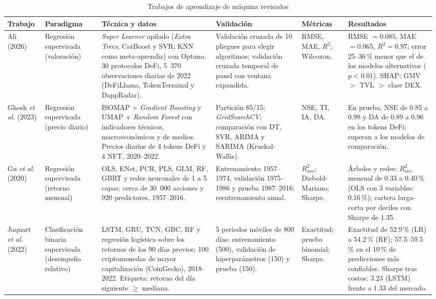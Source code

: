 \documentclass[letterpaper,journal]{IEEEtran}
\begin{document}
\begin{table}[!t]
\caption{Trabajos de aprendizaje de máquina revisados\label{tab:sota}}
\centering
\footnotesize
\setlength{\tabcolsep}{3pt}
\renewcommand{\arraystretch}{1.05}
\begin{tabular}{@{}L{0.075\textwidth}L{0.095\textwidth}L{0.29\textwidth}L{0.17\textwidth}L{0.085\textwidth}L{0.21\textwidth}@{}}
\toprule
\textbf{Trabajo} & \textbf{Paradigma} & \textbf{Técnica y datos} & \textbf{Validación} & \textbf{Métricas} & \textbf{Resultados} \\
\midrule
Ali (2026) \cite{ali2026} & Regresión supervisada (valoración) &
\emph{Super Learner} apilado (\emph{Extra Trees}, CatBoost y SVR; KNN como meta-aprendiz) con Optuna. 30 protocolos DeFi, 5~370 observaciones diarias de 2022 (DeFiLlama, TokenTerminal y DappRadar). &
Validación cruzada de 10 pliegues para elegir algoritmos; validación cruzada temporal de panel con ventana expandida. &
RMSE, MAE, $R^2$; Wilcoxon. &
RMSE $=0.085$, MAE $=0.065$, $R^2=0.97$; error 25--36\,\% menor que el de los modelos alternativos ($p<0.01$). SHAP: GMV $>$ TVL $>$ clase DEX. \\
\addlinespace
Ghosh \emph{et al.} (2023) \cite{ghosh2023} & Regresión supervisada (precio diario) &
ISOMAP + \emph{Gradient Boosting} y UMAP + \emph{Random Forest} con indicadores técnicos, macroeconómicos y de medios. Precios diarios de 4 tokens DeFi y 4 NFT, 2020--2022. &
Partición 85/15; \emph{GridSearchCV}; comparación con DT, SVR, ARIMA y SARIMA (Kruskal-Wallis). &
NSE, TI, IA, DA. &
En prueba, NSE de 0.85 a 0.98 y DA de 0.89 a 0.96 en los tokens DeFi; superan a los modelos de comparación. \\
\addlinespace
Gu \emph{et al.} (2020) \cite{gukellyxiu2020} & Regresión supervisada (retorno mensual) &
OLS, ENet, PCR, PLS, GLM, RF, GBRT y redes neuronales de 1 a 5 capas; cerca de 30~000 acciones y 920 predictores, 1957--2016. &
Entrenamiento 1957--1974, validación 1975--1986 y prueba 1987--2016; reentrenamiento anual. &
$R^2_{oos}$; Diebold-Mariano; Sharpe. &
Árboles y redes: $R^2_{oos}$ mensual de 0.33 a 0.40\,\% (OLS con 3 variables: 0.16\,\%); cartera larga-corta por deciles con Sharpe de 1.35. \\
\addlinespace
Jaquart \emph{et al.} (2022) \cite{jaquart2022} & Clasificación binaria supervisada (desempeño relativo) &
LSTM, GRU, TCN, GBC, RF y regresión logística sobre los retornos de los 90 días previos; 100 criptomonedas de mayor capitalización (CoinGecko), 2018--2022. Etiqueta: retorno del día siguiente $\geq$ mediana. &
5 periodos móviles de 800 días: entrenamiento (500), validación de hiperparámetros (150) y prueba (150). &
Exactitud; prueba binomial; Sharpe. &
Exactitud de 52.9\,\% (LR) a 54.2\,\% (RF); 57.5--59.5\,\% en el 10\,\% de predicciones más confiables. Sharpe tras costos: 3.23 (LSTM) frente a 1.33 del mercado. \\
\bottomrule
\end{tabular}
\end{table}
\end{document}
